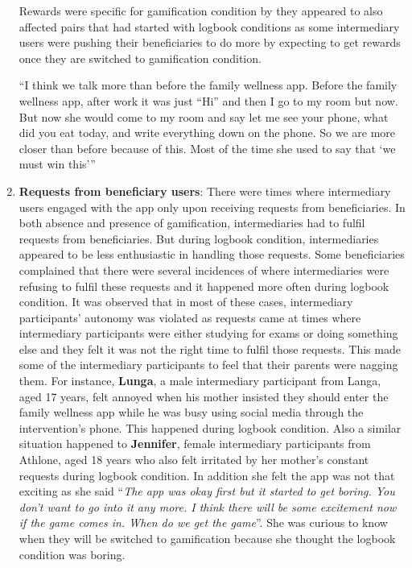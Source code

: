 \begin{enumerate}
Rewards were specific for gamification condition by they appeared to also affected pairs that had started with logbook conditions as some intermediary users were pushing their beneficiaries to do more by expecting to get rewards once they are switched to gamification condition.

 {``I think we talk more than before the family wellness app. Before the family wellness app, after work it was just ``Hi'' and then I go to my room but now. But now she would come to my room  and say let me see your phone,  what did you eat today,  and write everything down on the phone. So we are more closer than before because of this. Most of the time she used to say that `we must win this'''} 

\item{\textbf{Requests from beneficiary users}}: There were times where intermediary users engaged with the app only upon receiving requests from beneficiaries. In both absence and presence of gamification, intermediaries had to fulfil requests from beneficiaries.  But during logbook condition, intermediaries appeared to be less enthusiastic in handling those requests. Some beneficiaries complained that there were several incidences of where intermediaries were refusing to fulfil these requests and it happened more often during logbook condition. It was observed that in most of these cases, intermediary participants' autonomy was violated as requests came at times where intermediary participants were either studying for exams or doing something else and they felt it was not the right time to fulfil those requests. This made some of the intermediary participants to feel that their parents were nagging them. For instance, \textbf{Lunga}, a male intermediary participant from Langa, aged 17 years, felt annoyed when his mother insisted they should enter the family wellness app while he was busy using social media through the intervention's phone. This happened during logbook condition. Also a similar situation happened to \textbf{Jennifer}, female intermediary participants from Athlone, aged 18 years who also felt irritated by her mother's constant requests during logbook condition. In addition she felt the app was not that exciting as she said ``\emph{The app was okay first but it started to get boring. You don't want to go into it any more. I think there will be some excitement now if the game comes in. When do we get the game}''. She was curious to know when they will be switched to gamification because she thought the logbook condition was boring.


\end{enumerate}
